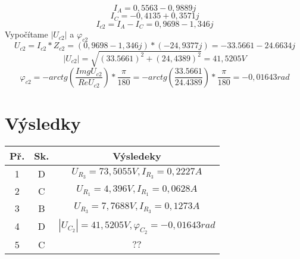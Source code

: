 \documentclass{article}
\begin{document}
$$I_A=0,5563-0,9889j$$
$$I_C=-0,4135+0,3571j$$
$$I_{c2}=I_A-I_C=0,9698-1,346j$$
Vypočítame $|U_{c2}|$ a $\varphi_{c2}$
$$U_{c2} = I_{c2} * Z_{c2} = (0,9698 - 1,346j) * (-24,9377j) = -33.5661 - 24.6634j$$
$$|U_{c2}| = \sqrt{(33.5661)^2 + (24,4389)^2} = 41,5205V$$
$$\varphi _{c2} = -arctg(\frac{ImgU_{c2}}{ReU_{c2}}) * \frac{\pi}{180} = -arctg(\frac{33.5661}{24.4389}) * \frac{\pi}{180}= -0,01643 rad$$
\newpage
\section*{Výsledky}


\vspace{50px}

\begin{center}
    \begin{tabular}{| c | c | c |}
        \hline
        \textbf{Př.} & \textbf{Sk.} & \textbf{Výsledeky} \\
        \hline
        1 & D & $U_{R_3} = 73,5055V, I_{R_3} = 0,2227A$ \\
        \hline
        2 & C & $U_{R_1} = 4,396V, I_{R_1} = 0,0628A$ \\
        \hline
        3 & B & $U_{R_3} = 7,7688V, I_{R_3} = 0,1273A$ \\
        \hline
        4 & D & $|U_{C_2}| = 41,5205V, \varphi_{C_2} = -0,01643rad$ \\
        \hline
        5 & C & $??$ \\
        \hline
    \end{tabular}
\end{center}
\end{document}
